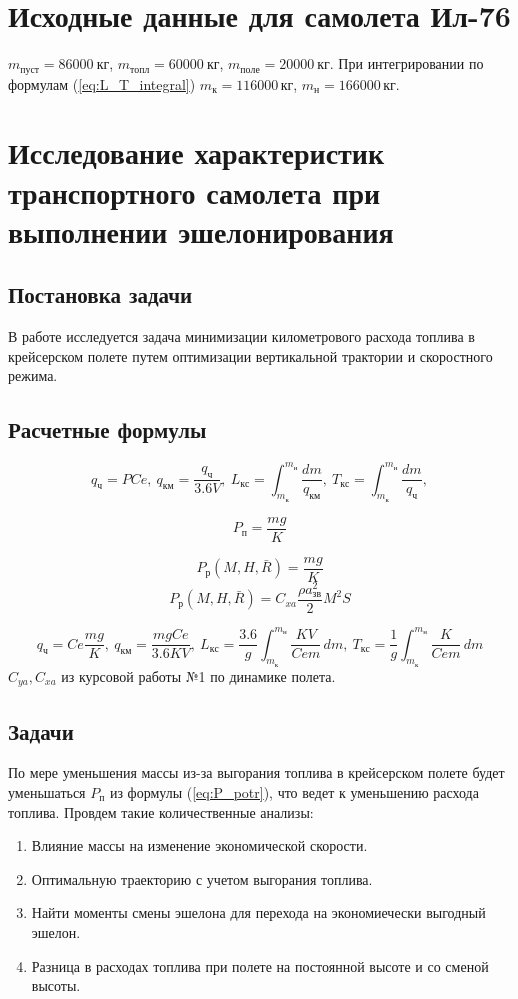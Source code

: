 \documentclass[bachelor,subf,14pt, substylefile = spbu.rtx]{disser}
\begin{document}
\section{Исходные данные для самолета Ил-76}
$m_{пуст} = 86000\ \text{кг}$, $m_{топл}= 60000\ \text{кг}$, $m_{поле}=20000\ \text{кг}$.
При интегрировании по формулам (\ref{eq:L_T_integral}) $m_{к}=116000\, кг$, $m_{н}=166000\, кг$.

\section{Исследование характеристик транспортного самолета при выполнении эшелонирования}
\subsection{Постановка задачи}
В работе исследуется задача минимизации километрового расхода топлива в крейсерском полете путем оптимизации вертикальной трактории и скоростного режима.  

\subsection{Расчетные формулы} 
\begin{equation}
\label{eq:L_T_integral}
q_{ч}=P Ce, \: q_{км}=\frac{q_{ч}}{3.6 V}, \: L_{кс}= \int_{m_к}^{m_н} \frac{dm}{q_{км}},\: T_{кс}= \int_{m_к}^{m_н} \frac{dm}{q_{ч}},
\end{equation}

\begin{equation}
\label{eq:P_potr}
P_п = \frac{mg}{K} 
\end{equation}

\[
P_р(M, H, \bar{R})=\frac{mg}{K} 
\]
\[
P_р(M, H, \bar{ R }) = C_{xa} \frac{\rho a_{зв}^2}{2}M^2 S   
\]

\[ 
q_ч = Ce \frac{mg}{K}, \: q_{км} = \frac{mg Ce}{3.6KV}, \: L_{кс}= \frac{3.6}{g}\int_{m_к}^{m_н} \frac{KV}{Ce m}
\, dm, \: T_{кс}= \frac{1}{g} \int_{m_к}^{m_н} \frac{K}{Ce m}\, dm
\]
$C_{ya}, C_{xa}$ из курсовой работы №1 по динамике полета.

\subsection{Задачи}
По мере уменьшения массы из-за выгорания топлива в крейсерском полете будет уменьшаться $P_п$ из формулы (\ref{eq:P_potr}), что ведет к уменьшению расхода топлива.  
Провдем такие количественные анализы:  
\begin{enumerate}
    \item Влияние массы на изменение экономической скорости.  
    \item Оптимальную траекторию с учетом выгорания топлива.
    \item Найти моменты смены эшелона для перехода на экономиечески выгодный эшелон. 
    \item Разница в расходах топлива при полете на постоянной высоте и со сменой высоты.
\end{enumerate}
\end{document}
